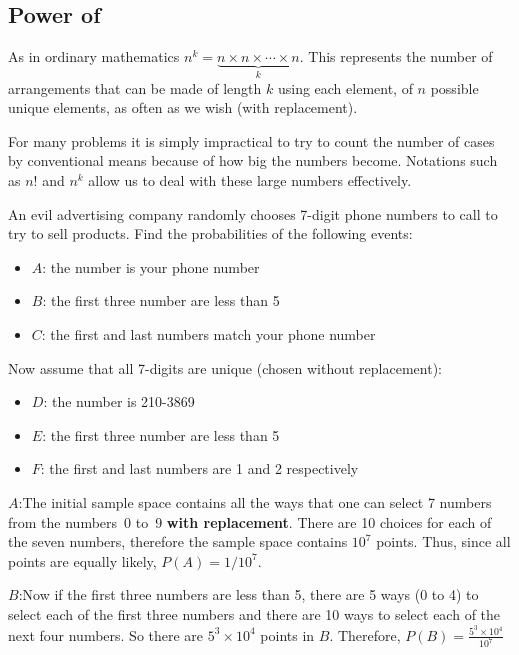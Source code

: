 \subsection*{Power of}
As in ordinary mathematics $n^k = \underbrace{n \times n \times \cdots \times n}_k$. This represents the number of arrangements that can be made of length $k$ using each element, of $n$ possible unique elements, as often as we wish (with replacement).
\begin{info}
For many problems it is simply impractical to try to count the number of cases by conventional means because of how big the numbers become. Notations such as $n!$ and $n^k$ allow us to deal with these large numbers effectively.
\end{info}
\begin{example}
An evil advertising company randomly chooses 7-digit phone numbers to call to try to sell products. Find the probabilities of the following events:
\begin{itemize}[noitemsep, topsep=4pt plus 2pt minus 1pt]
    \item $A$: the number is your phone number
    \item $B$: the first three number are less than 5
    \item $C$: the first and last numbers match your phone number
\end{itemize}
Now assume that all 7-digits are unique (chosen without replacement):
\begin{itemize}[noitemsep, topsep=4pt plus 2pt minus 1pt]
    \item $D$: the number is 210-3869
    \item $E$: the first three number are less than 5
    \item $F$: the first and last numbers are 1 and 2 respectively
\end{itemize}
\tcblower
$A$:\hspace{5mm}The initial sample space contains all the ways that one can select 7 numbers from the numbers~0 to~9 \textbf{with replacement}. There are 10 choices for each of the seven numbers, therefore the sample space contains $10^7$ points. Thus, since all points are equally likely, $P(A) = 1/10^7$.
\par\smallskip
$B$:\hspace{5mm}Now if the first three numbers are less than 5, there are 5 ways (0 to 4) to select each of the first three numbers and there are 10 ways to select each of the next four numbers. So there are $5^3 \times 10^4$ points in $B$. Therefore, $P(B) = \frac{5^3 \times 10^4}{10^7}$

\end{example}
